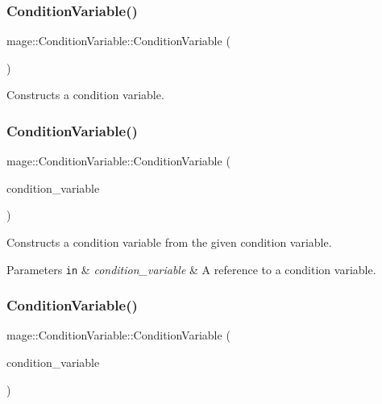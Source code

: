 \subsubsection{\texorpdfstring{Condition\+Variable()}{ConditionVariable()}\hspace{0.1cm}{\footnotesize\ttfamily [1/3]}}
{\footnotesize\ttfamily mage\+::\+Condition\+Variable\+::\+Condition\+Variable (\begin{DoxyParamCaption}{ }\end{DoxyParamCaption})}

Constructs a condition variable. \hypertarget{classmage_1_1_condition_variable_add5ccf5807a94588c28621141df334d3}{}\label{classmage_1_1_condition_variable_add5ccf5807a94588c28621141df334d3} 
\subsubsection{\texorpdfstring{Condition\+Variable()}{ConditionVariable()}\hspace{0.1cm}{\footnotesize\ttfamily [2/3]}}
{\footnotesize\ttfamily mage\+::\+Condition\+Variable\+::\+Condition\+Variable (\begin{DoxyParamCaption}\item[{const \hyperlink{classmage_1_1_condition_variable}{Condition\+Variable} \&}]{condition\+\_\+variable }\end{DoxyParamCaption})\hspace{0.3cm}{\ttfamily [delete]}}

Constructs a condition variable from the given condition variable.


\begin{DoxyParams}[1]{Parameters}
\mbox{\tt in}  & {\em condition\+\_\+variable} & A reference to a condition variable. \\
\hline
\end{DoxyParams}
\hypertarget{classmage_1_1_condition_variable_a225e5144abef5b2ba1d8393777f1c4f1}{}\label{classmage_1_1_condition_variable_a225e5144abef5b2ba1d8393777f1c4f1} 
\subsubsection{\texorpdfstring{Condition\+Variable()}{ConditionVariable()}\hspace{0.1cm}{\footnotesize\ttfamily [3/3]}}
{\footnotesize\ttfamily mage\+::\+Condition\+Variable\+::\+Condition\+Variable (\begin{DoxyParamCaption}\item[{\hyperlink{classmage_1_1_condition_variable}{Condition\+Variable} \&\&}]{condition\+\_\+variable }\end{DoxyParamCaption})\hspace{0.3cm}{\ttfamily [delete]}}

